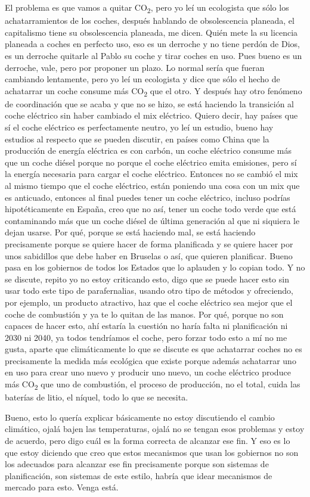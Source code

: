 El problema es que vamos a quitar CO\textsubscript{2}, pero yo leí un ecologista que sólo los achatarramientos de los coches, después hablando de obsolescencia planeada, el capitalismo tiene su obsolescencia planeada, me dicen. Quién mete la su licencia planeada a coches en perfecto uso, eso es un derroche y no tiene perdón de Dios, es un derroche quitarle al Pablo su coche y tirar coches en uso. Pues bueno es un derroche, vale, pero por proponer un plazo. Lo normal sería que fueran cambiando lentamente, pero yo leí un ecologista y dice que sólo el hecho de achatarrar un coche consume más CO\textsubscript{2} que el otro. Y después hay otro fenómeno de coordinación que se acaba y que no se hizo, se está haciendo la transición al coche eléctrico sin haber cambiado el mix eléctrico. Quiero decir, hay países que sí el coche eléctrico es perfectamente neutro, yo leí un estudio, bueno hay estudios al respecto que se pueden discutir, en países como China que la producción de energía eléctrica es con carbón, un coche eléctrico consume más que un coche diésel porque no porque el coche eléctrico emita emisiones, pero sí la energía necesaria para cargar el coche eléctrico. Entonces no se cambió el mix al mismo tiempo que el coche eléctrico, están poniendo una cosa con un mix que es anticuado, entonces al final puedes tener un coche eléctrico, incluso podrías hipotéticamente en España, creo que no así, tener un coche todo verde que está contaminando más que un coche diésel de última generación al que ni siquiera le dejan usarse. Por qué, porque se está haciendo mal, se está haciendo precisamente porque se quiere hacer de forma planificada y se quiere hacer por unos sabidillos que debe haber en Bruselas o así, que quieren planificar. Bueno pasa en los gobiernos de todos los Estados que lo aplauden y lo copian todo. Y no se discute, repito yo no estoy criticando esto, digo que se puede hacer esto sin usar todo este tipo de parafernalias, usando otro tipo de métodos y ofreciendo, por ejemplo, un producto atractivo, haz que el coche eléctrico sea mejor que el coche de combustión y ya te lo quitan de las manos. Por qué, porque no son capaces de hacer esto, ahí estaría la cuestión no haría falta ni planificación ni 2030 ni 2040, ya todos tendríamos el coche, pero forzar todo esto a mí no me gusta, aparte que climáticamente lo que se discute es que achatarrar coches no es precisamente la medida más ecológica que existe porque además achatarrar uno en uso para crear uno nuevo y producir uno nuevo, un coche eléctrico produce más CO\textsubscript{2} que uno de combustión, el proceso de producción, no el total, cuida las baterías de litio, el níquel, todo lo que se necesita.

Bueno, esto lo quería explicar básicamente no estoy discutiendo el cambio climático, ojalá bajen las temperaturas, ojalá no se tengan esos problemas y estoy de acuerdo, pero digo cuál es la forma correcta de alcanzar ese fin. Y eso es lo que estoy diciendo que creo que estos mecanismos que usan los gobiernos no son los adecuados para alcanzar ese fin precisamente porque son sistemas de planificación, son sistemas de este estilo, habría que idear mecanismos de mercado para esto. Venga está.

